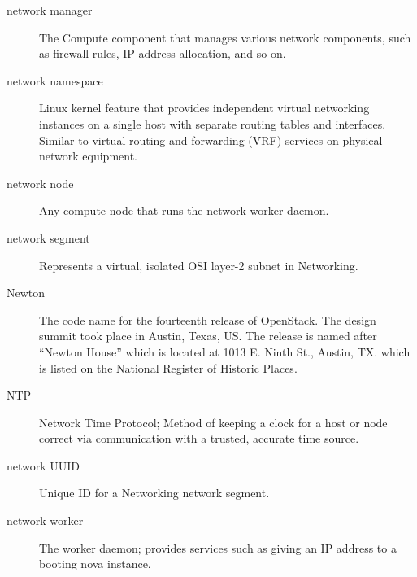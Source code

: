 \documentclass[letterpaper,10pt,english]{sphinxmanual}
\begin{document}
\begin{description}
\item[{network manager}] \leavevmode{}\label{_source/glossary:term-network-manager}
The Compute component that manages various network components,
such as firewall rules, IP address allocation, and so on.

\item[{network namespace}] \leavevmode{}\label{_source/glossary:term-network-namespace}
Linux kernel feature that provides independent virtual
networking instances on a single host with separate routing
tables and interfaces. Similar to virtual routing and forwarding
(VRF) services on physical network equipment.

\item[{network node}] \leavevmode{}\label{_source/glossary:term-network-node}
Any compute node that runs the network worker daemon.

\item[{network segment}] \leavevmode{}\label{_source/glossary:term-network-segment}
Represents a virtual, isolated OSI layer-2 subnet in
Networking.

\item[{Newton}] \leavevmode{}\label{_source/glossary:term-newton}
The code name for the fourteenth release of OpenStack. The
design summit took place in Austin, Texas, US. The
release is named after ``Newton House'' which is located at
1013 E. Ninth St., Austin, TX. which is listed on the
National Register of Historic Places.

\item[{NTP}] \leavevmode{}\label{_source/glossary:term-ntp}
Network Time Protocol; Method of keeping a clock for a host or
node correct via communication with a trusted, accurate time
source.

\item[{network UUID}] \leavevmode{}\label{_source/glossary:term-network-uuid}
Unique ID for a Networking network segment.

\item[{network worker}] \leavevmode{}\label{_source/glossary:term-network-worker}
The  worker daemon; provides
services such as giving an IP address to a booting nova
instance.


\end{description}
\end{document}
